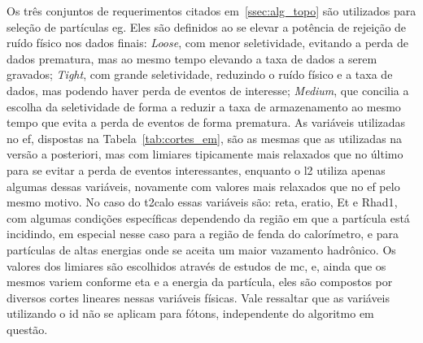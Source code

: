 

Os três conjuntos de requerimentos citados em~\ref{ssec:alg_topo} são utilizados para 
seleção de partículas \gls{eg}. Eles são definidos ao se elevar a potência de rejeição 
de ruído físico nos dados finais: \emph{Loose}, com menor seletividade, 
evitando a perda de dados prematura, mas ao mesmo tempo elevando a taxa de dados 
a serem gravados; \emph{Tight}, com grande seletividade, reduzindo o
ruído físico e a taxa de dados, mas podendo haver perda de eventos de interesse;
\emph{Medium}, que concilia a escolha da seletividade de forma
a reduzir a taxa de armazenamento ao mesmo tempo que evita a perda de eventos
de forma prematura. As variáveis utilizadas no \gls{ef}, dispostas na
Tabela~\ref{tab:cortes_em}, são as mesmas que as
utilizadas na versão a posteriori, mas com limiares tipicamente mais relaxados
que no último para se evitar a perda de eventos interessantes, enquanto o
\gls{l2} utiliza apenas algumas dessas variáveis, novamente com valores mais relaxados que no 
\gls{ef} pelo mesmo motivo. No caso do \gls{t2calo} essas variáveis são: \gls{reta}, 
\gls{eratio}, \gls{Et} e \gls{Rhad1}, com algumas condições específicas 
dependendo da região em que a partícula está incidindo, em especial nesse 
caso para a região de fenda do calorímetro, e para partículas de altas energias onde se aceita um maior
vazamento hadrônico. Os valores dos limiares são escolhidos através de estudos
de \gls{mc}, e, ainda que os mesmos variem conforme \gls{eta} e a energia da
partícula, eles são compostos por diversos cortes lineares nessas variáveis
físicas. Vale ressaltar que as variáveis utilizando o \gls{id} 
não se aplicam para fótons, independente do algoritmo em questão.


